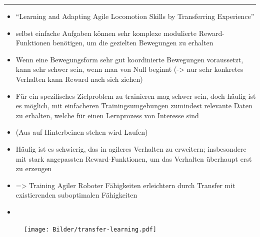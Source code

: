 \hrule
\begin{itemize}
    \item \enquote{Learning and Adapting Agile Locomotion Skills by Transferring Experience}
    \item selbst einfache Aufgaben können sehr komplexe modulierte Reward-Funktionen benötigen, um die gezielten Bewegungen zu erhalten
    \item Wenn eine Bewegungsform sehr gut koordinierte Bewegungen voraussetzt, kann sehr schwer sein, wenn man von Null beginnt (-> nur sehr konkretes Verhalten kann Reward nach sich ziehen)
    \item Für ein spezifisches Zielproblem zu trainieren mag schwer sein, doch häufig ist es möglich, mit einfacheren Trainingsumgebungen zumindest relevante Daten zu erhalten, welche für einen Lernprozess von Interesse sind
    \item (Aus auf Hinterbeinen stehen wird Laufen)
    \item Häufig ist es schwierig, das in agileres Verhalten zu erweitern; insbesondere mit stark angepassten Reward-Funktionen, um das Verhalten überhaupt erst zu erzeugen
    \item => Training Agiler Roboter Fähigkeiten erleichtern durch Transfer mit existierenden suboptimalen Fähigkeiten
    \item \cite{smith2023learning}
\end{itemize}

\begin{figure}
    \centering
    \texttt{[image: Bilder/transfer-learning.pdf]}
    \caption{\cite{smith2023learning}}
\end{figure}